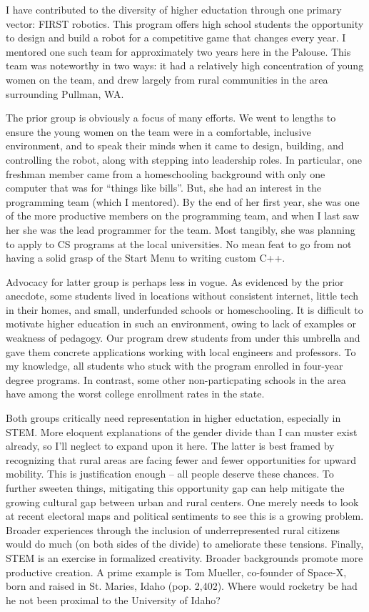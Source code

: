 I have contributed to the diversity of higher eductation through one primary vector:
FIRST robotics. This program offers high school students the opportunity to design and
build a robot for a competitive game that changes every year. I mentored one such team
for approximately two years here in the Palouse. This team was noteworthy in two ways:
it had a relatively high concentration of young women on the team, and drew largely from
rural communities in the area surrounding Pullman, WA.

The prior group is obviously a focus of many efforts. We went to lengths to ensure
the young women on the team were in a comfortable, inclusive environment, and to speak
their minds when it came to design, building, and controlling the robot, along with
stepping into leadership roles. In particular, one freshman member came from a
homeschooling background with only one computer that was for ``things like bills''.
But, she had an interest in the programming team (which I mentored).
By the end of her first year, she was one of the more productive members on the
programming team, and when I last saw her she was the lead programmer for the team.
Most tangibly, she was planning to apply to CS programs at the local universities.
No mean feat to go from not having a solid grasp of the Start Menu to writing
custom C++.

Advocacy for latter group is perhaps less in vogue. As evidenced by the prior anecdote, some
students lived in locations without consistent internet, little tech in their
homes, and small, underfunded schools or homeschooling. It is difficult to motivate
higher education in such an environment, owing to lack of examples or weakness of
pedagogy. Our program drew students from under this umbrella and gave them concrete
applications working with local engineers and professors. To my knowledge, all
students who stuck with the program enrolled in four-year degree programs. In contrast,
some other non-particpating schools in the area have among the worst college enrollment
rates in the state.

Both groups critically need representation in higher eductation, especially in STEM.
More eloquent explanations of the gender divide than I can muster exist already, so
I'll neglect to expand upon it here. The latter is best framed by recognizing that
rural areas are facing fewer and fewer opportunities for upward mobility. This is
justification enough -- all people deserve these chances. To further sweeten things,
mitigating this opportunity gap can help mitigate the growing cultural gap between
urban and rural centers. One merely needs to look at recent electoral maps and
political sentiments to see this is a growing problem. Broader experiences through
the inclusion of underrepresented rural citizens would do much (on both sides of
the divide) to ameliorate these tensions. Finally, STEM is an exercise in formalized
creativity.  Broader backgrounds promote more productive creation. A prime example
is Tom Mueller, co-founder of Space-X, born and raised in St. Maries, Idaho
(pop. 2,402). Where would rocketry be had he not been proximal to the University of Idaho?
